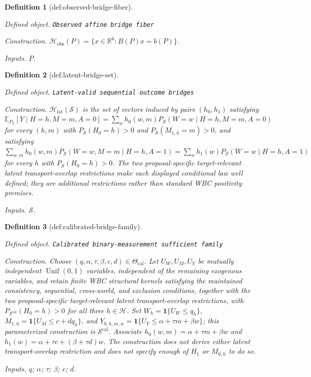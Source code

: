 \documentclass{article}
\newtheorem{definition}{Definition}
\begin{document}
\begin{definition}[def:observed-bridge-fiber]\label{def:observed-bridge-fiber}
\par\smallskip\noindent\emph{Defined object.} \texttt{Observed affine bridge fiber}
\par\smallskip\noindent\emph{Construction.} \(\mathcal H_{\mathrm{obs}}(P)=\{x\in\mathbb R^6:B(P)x=b(P)\}\).
\par\smallskip\noindent\emph{Inputs.} \(P\).
\end{definition}

\begin{definition}[def:latent-bridge-set]\label{def:latent-bridge-set}
\par\smallskip\noindent\emph{Defined object.} \texttt{Latent-\allowbreak{}valid sequential outcome bridges}
\par\smallskip\noindent\emph{Construction.} \(\mathcal H_{\mathrm{lat}}(\mathcal S)\) is the set of vectors induced by pairs \((h_0,h_1)\) satisfying \(\mathbb E_{P_{\mathcal S}}[Y\mid H=h,M=m,A=0]=\sum_w h_0(w,m)P_{\mathcal S}(W=w\mid H=h,M=m,A=0)\) for every \((h,m)\) with \(P_{\mathcal S}(H_0=h)>0\) and \(P_{\mathcal S}(M_{1,h}=m)>0\), and satisfying \(\sum_{w,m}h_0(w,m)P_{\mathcal S}(W=w,M=m\mid H=h,A=1)=\sum_w h_1(w)P_{\mathcal S}(W=w\mid H=h,A=1)\) for every \(h\) with \(P_{\mathcal S}(H_0=h)>0\). The two proposal-specific target-relevant latent transport-overlap restrictions make each displayed conditional law well defined; they are additional restrictions rather than standard WBC positivity premises.
\par\smallskip\noindent\emph{Inputs.} \(\mathcal S\).
\end{definition}

\begin{definition}[def:calibrated-bridge-family]\label{def:calibrated-bridge-family}
\par\smallskip\noindent\emph{Defined object.} \texttt{Calibrated binary-\allowbreak{}measurement sufficient family}
\par\smallskip\noindent\emph{Construction.} Choose \((q,\alpha,\tau,\beta,c,d)\in\Theta_{\mathrm{cal}}\). Let \(U_W,U_M,U_Y\) be mutually independent \(\operatorname{Unif}(0,1)\) variables, independent of the remaining exogenous variables, and retain finite WBC structural kernels satisfying the maintained consistency, sequential, cross-world, and exclusion conditions, together with the two proposal-specific target-relevant latent transport-overlap restrictions, with \(P_{\mathcal S^{\mathrm{cal}}}(H_0=h)>0\) for all three \(h\in\mathcal H\). Set \(W_h=\mathbf 1\{U_W\le q_h\}\), \(M_{1,h}=\mathbf 1\{U_M\le c+dq_h\}\), and \(Y_{0,h,m,w}=\mathbf 1\{U_Y\le\alpha+\tau m+\beta w\}\); this parameterized construction is \(\mathcal S^{\mathrm{cal}}\). Associate \(h_0(w,m)=\alpha+\tau m+\beta w\) and \(h_1(w)=\alpha+\tau c+(\beta+\tau d)w\). The construction does not derive either latent transport-overlap restriction and does not specify enough of \(H_1\) or \(M_{0,h}\) to do so.
\par\smallskip\noindent\emph{Inputs.} \(q\); \(\alpha\); \(\tau\); \(\beta\); \(c\); \(d\).
\end{definition}
\end{document}

